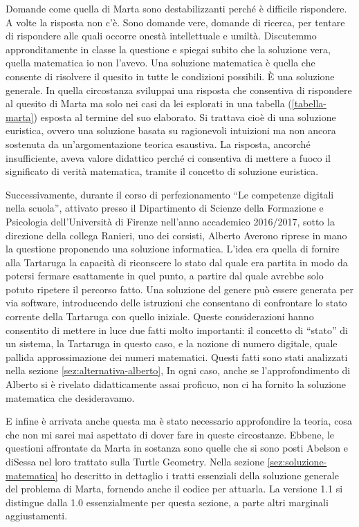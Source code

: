 Domande come quella di Marta sono destabilizzanti perché è difficile rispondere. A volte la risposta non c'è. Sono domande vere, domande di ricerca, per tentare di rispondere alle quali occorre onestà intellettuale e umiltà. Discutemmo appronditamente in classe la questione e spiegai subito che la soluzione vera, quella matematica io non l'avevo. Una soluzione matematica è quella che consente di risolvere il quesito in tutte le condizioni possibili. È una soluzione generale. In quella circostanza sviluppai una risposta che consentiva di rispondere al quesito di Marta ma solo nei casi da lei esplorati in una tabella (\ref{tabella-marta}) esposta al termine del suo elaborato. Si trattava cioè di una soluzione euristica, ovvero una soluzione basata su ragionevoli intuizioni ma non ancora sostenuta da un'argomentazione teorica esaustiva. La risposta, ancorché insufficiente, aveva valore didattico perché ci consentiva di mettere a fuoco il significato di verità matematica, tramite il concetto di soluzione euristica. 

Successivamente, durante il corso di perfezionamento “Le competenze digitali nella scuola”, attivato presso il Dipartimento di Scienze della Formazione e Psicologia dell'Università di Firenze nell'anno accademico 2016/2017, sotto la direzione della collega Ranieri, uno dei corsisti, Alberto Averono riprese in mano la questione proponendo una soluzione informatica. L'idea era quella di fornire alla Tartaruga la capacità di riconscere lo stato dal quale era partita in modo da potersi fermare esattamente in quel punto, a partire dal quale avrebbe solo potuto ripetere il percorso fatto. Una soluzione del genere può essere generata per via software, introducendo delle istruzioni che consentano di confrontare lo stato corrente della Tartaruga con quello iniziale. Queste considerazioni hanno consentito di mettere in luce due fatti molto importanti: il concetto di ``stato'' di un sistema, la Tartaruga in questo caso, e la nozione di numero digitale, quale pallida approssimazione dei numeri matematici. Questi fatti sono stati analizzati nella sezione \ref{sez:alternativa-alberto}, In ogni caso, anche se l'approfondimento di Alberto si è rivelato didatticamente assai proficuo, non ci ha fornito la soluzione matematica che desideravamo.

E infine è arrivata anche questa ma è stato necessario approfondire la teoria, cosa che non mi sarei mai aspettato di dover fare in queste circostanze. Ebbene, le questioni affrontate da Marta in sostanza sono quelle che si sono posti Abelson e diSessa\cite{Abelson} nel loro trattato sulla Turtle Geometry. Nella sezione \ref{sez:soluzione-matematica} ho descritto in dettaglio i tratti essenziali della soluzione generale del problema di Marta, fornendo anche il codice per attuarla. La versione 1.1 si distingue dalla 1.0 essenzialmente per questa sezione, a parte altri marginali aggiustamenti.

